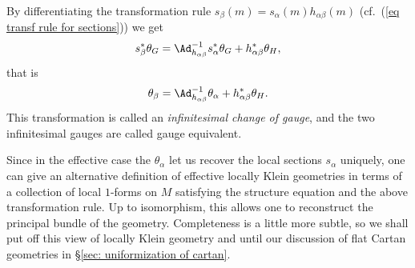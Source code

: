 By differentiating the transformation rule $ s_\beta(m)= s_\alpha(m)h_{\alpha\beta}(m)$ (cf.\ (\ref{eq transf rule for sections})) we get
\[ s_\beta^{\ast}\theta_G=\Ad_{h_{\alpha\beta}}^{-1} s_\alpha^\ast\theta_G+h_{\alpha\beta}^\ast\theta_H,\]
that is
\[\theta_\beta=\Ad_{h_{\alpha\beta}}^{-1}\theta_\alpha+h_{\alpha\beta}^\ast\theta_H.\]
This transformation is called an \emph{infinitesimal change of gauge}, and the two infinitesimal gauges are called gauge equivalent.

Since in the effective case the $\theta_\alpha$ let us recover the local sections $s_\alpha$ uniquely, one can give an alternative definition of effective locally Klein geometries in terms of a collection of local $1$-forms on $M$ satisfying the structure equation and the above transformation rule. Up to isomorphism, this allows one to reconstruct the principal bundle of the geometry. Completeness is a little more subtle, so we shall put off this view of locally Klein geometry and until our discussion of flat Cartan geometries in \S\ref{sec: uniformization of cartan}.





    

